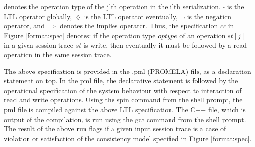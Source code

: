 \documentclass[journal,compsoc]{IEEEtran}
\begin{document}
     denotes the operation type of the j'th operation in the i'th serialization. $\square$ is the LTL operator globally, $\lozenge$ is the LTL operator eventually, $\lnot$ is the negation operator, and   $\Rightarrow$ denotes the implies operator.  Thus, the specification $cc$ in  Figure \ref{format:spec} denotes: if the operation type $\mathit{optype}$ of an operation $\mathit{st}[j]$ in a given session trace $\mathit{st}$ is write, then eventually it must be followed by a read operation in the same session trace.
  \par The above specification is provided in the .pml (PROMELA) file, as a declaration statement on top. In the pml file, the declarative statement is followed by the operational specification of the system behaviour with respect to interaction of read and write operations. Using the spin command from the shell prompt,  the pml file is compiled against the above LTL specification.  The C++ file, which is output of the compilation, is run using the gcc command from the shell prompt. The result of the above run flags if a given input session trace is a case of violation or satisfaction of the consistency model specified in Figure \ref{format:spec}.  
  


\end{document}
